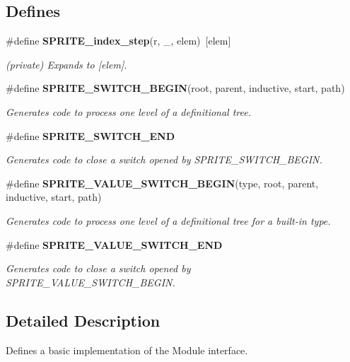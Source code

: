 \subsection*{Defines}
\begin{CompactItemize}
\item 
\#define {\bf SPRITE\_\-index\_\-step}(r, \_\-, elem)\ [elem]\label{user__module_8hpp_a0}

\begin{CompactList}\small\item\em (private) Expands to [elem]. \item\end{CompactList}\item 
\#define {\bf SPRITE\_\-SWITCH\_\-BEGIN}(root, parent, inductive, start, path)
\begin{CompactList}\small\item\em Generates code to process one level of a definitional tree. \item\end{CompactList}\item 
\#define {\bf SPRITE\_\-SWITCH\_\-END}
\begin{CompactList}\small\item\em Generates code to close a switch opened by SPRITE\_\-SWITCH\_\-BEGIN. \item\end{CompactList}\item 
\#define {\bf SPRITE\_\-VALUE\_\-SWITCH\_\-BEGIN}(type, root, parent, inductive, start, path)
\begin{CompactList}\small\item\em Generates code to process one level of a definitional tree for a built-in type. \item\end{CompactList}\item 
\#define {\bf SPRITE\_\-VALUE\_\-SWITCH\_\-END}
\begin{CompactList}\small\item\em Generates code to close a switch opened by SPRITE\_\-VALUE\_\-SWITCH\_\-BEGIN. \item\end{CompactList}\end{CompactItemize}


\subsection{Detailed Description}
Defines a basic implementation of the Module interface. 



